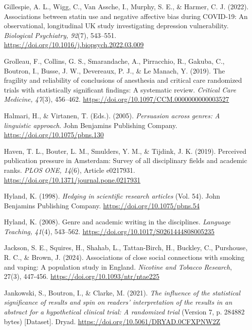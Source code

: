 \documentclass[authordate, meta]{jote-new-article}
\begin{document}
	Gillespie, A. L., Wigg, C., Van Assche, I., Murphy, S. E., \& Harmer, C. J. (2022). Associations between statin use and negative affective bias during COVID-19: An observational, longitudinal UK study investigating depression vulnerability. \emph{Biological Psychiatry, 92}(7), 543--551. \url{https://doi.org/10.1016/j.biopsych.2022.03.009}



	Grolleau, F., Collins, G. S., Smarandache, A., Pirracchio, R., Gakuba, C., Boutron, I., Busse, J. W., Devereaux, P. J., \& Le Manach, Y. (2019). The fragility and reliability of conclusions of anesthesia and critical care randomized trials with statistically significant findings: A systematic review. \emph{Critical Care Medicine, 47}(3), 456--462. \url{https://doi.org/10.1097/CCM.0000000000003527}



	Halmari, H., \& Virtanen, T. (Eds.). (2005). \emph{Persuasion across genres: A linguistic approach}. John Benjamins Publishing Company. \url{https://doi.org/10.1075/pbns.130}



	Haven, T. L., Bouter, L. M., Smulders, Y. M., \& Tijdink, J. K. (2019). Perceived publication pressure in Amsterdam: Survey of all disciplinary fields and academic ranks. \emph{PLOS ONE, 14}(6), Article e0217931. \url{https://doi.org/10.1371/journal.pone.0217931}



	Hyland, K. (1998). \emph{Hedging in scientific research articles }(Vol. 54). John Benjamins Publishing Company. \url{https://doi.org/10.1075/pbns.54}



	Hyland, K. (2008). Genre and academic writing in the disciplines. \emph{Language Teaching, 41}(4), 543--562. \url{https://doi.org/10.1017/S0261444808005235}



	Jackson, S. E., Squires, H., Shahab, L., Tattan-Birch, H., Buckley, C., Purshouse, R. C., \& Brown, J. (2024). Associations of close social connections with smoking and vaping: A population study in England. \emph{Nicotine and Tobacco Research}, 27(3), 447-456. \url{https://doi.org/10.1093/ntr/ntae225}



	Jankowski, S., Boutron, I., \& Clarke, M. (2021). \emph{The influence of the statistical significance of results and spin on readers' interpretation of the results in an abstract for a hypothetical clinical trial: A randomized trial} (Version 7, p. 284882 bytes) [Dataset]. Dryad. \url{https://doi.org/10.5061/DRYAD.0CFXPNW2Z}
\end{document}
